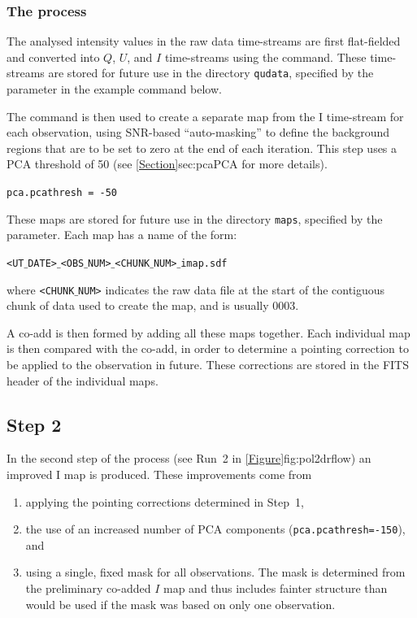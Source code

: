 \subsubsection*{The process}
The analysed intensity values in the raw data time-streams are first
flat-fielded and converted into $Q$, $U$, and $I$ time-streams using the
 command. These time-streams
are stored for future use in the directory \texttt{qudata}, specified by the
 parameter in the example command below.

The  command is then used to
create a separate map from the I time-stream for each observation,
using SNR-based ``auto-masking'' to define the background regions that
are to be set to zero at the end of each iteration. This step uses a
PCA threshold of 50 (see \cref{Section}{sec:pca}{PCA} for more details).

\texttt{pca.pcathresh = -50}

These maps are stored for future use in the directory \texttt{maps},
specified by the  parameter. Each map has a name of the form:

\texttt{<UT$\_$DATE>$\_$<OBS$\_$NUM>$\_$<CHUNK$\_$NUM>$\_$imap.sdf}

where \texttt{<CHUNK$\_$NUM>} indicates the raw data file at the start
of the contiguous chunk of data used to create the map, and is usually
0003.

A co-add is then formed by adding all these maps together. Each individual map
is then compared with the co-add, in order to determine a pointing correction
to be applied to the observation in future. These corrections are stored
in the FITS header of the individual maps.


\subsection*{Step 2}

In the second step of the process (see Run~2 in
\cref{Figure}{fig:pol2drflow}{}) an improved I map is produced. These
improvements come from
\begin{enumerate}
\item applying the pointing corrections determined in Step~1,
\item the use of an increased number of PCA components
  (\texttt{pca.pcathresh=-150}), and
\item using a single, fixed mask for all observations. The mask is
  determined from the preliminary co-added $I$ map and thus includes
  fainter structure than would be used if the mask was based on only
  one observation.
\end{enumerate}

